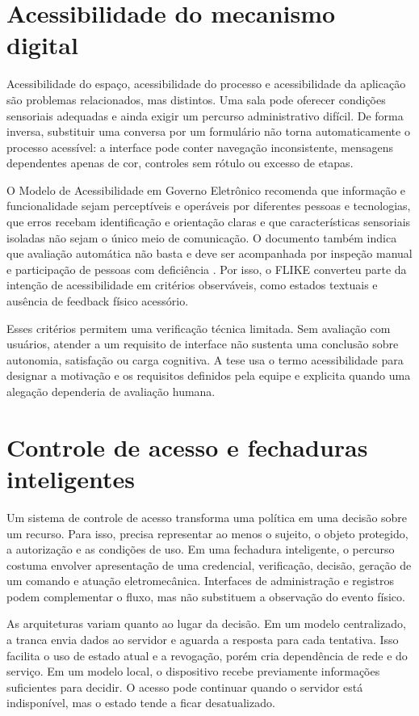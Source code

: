 \section{Acessibilidade do mecanismo digital}

Acessibilidade do espaço, acessibilidade do processo e acessibilidade da aplicação são problemas relacionados, mas distintos. Uma sala pode oferecer condições sensoriais adequadas e ainda exigir um percurso administrativo difícil. De forma inversa, substituir uma conversa por um formulário não torna automaticamente o processo acessível: a interface pode conter navegação inconsistente, mensagens dependentes apenas de cor, controles sem rótulo ou excesso de etapas.

O Modelo de Acessibilidade em Governo Eletrônico recomenda que informação e funcionalidade sejam perceptíveis e operáveis por diferentes pessoas e tecnologias, que erros recebam identificação e orientação claras e que características sensoriais isoladas não sejam o único meio de comunicação. O documento também indica que avaliação automática não basta e deve ser acompanhada por inspeção manual e participação de pessoas com deficiência \cite{brasil2014emag}. Por isso, o FLIKE converteu parte da intenção de acessibilidade em critérios observáveis, como estados textuais e ausência de feedback físico acessório.

Esses critérios permitem uma verificação técnica limitada. Sem avaliação com usuários, atender a um requisito de interface não sustenta uma conclusão sobre autonomia, satisfação ou carga cognitiva. A tese usa o termo acessibilidade para designar a motivação e os requisitos definidos pela equipe e explicita quando uma alegação dependeria de avaliação humana.

\section{Controle de acesso e fechaduras inteligentes}

Um sistema de controle de acesso transforma uma política em uma decisão sobre um recurso. Para isso, precisa representar ao menos o sujeito, o objeto protegido, a autorização e as condições de uso. Em uma fechadura inteligente, o percurso costuma envolver apresentação de uma credencial, verificação, decisão, geração de um comando e atuação eletromecânica. Interfaces de administração e registros podem complementar o fluxo, mas não substituem a observação do evento físico.

As arquiteturas variam quanto ao lugar da decisão. Em um modelo centralizado, a tranca envia dados ao servidor e aguarda a resposta para cada tentativa. Isso facilita o uso de estado atual e a revogação, porém cria dependência de rede e do serviço. Em um modelo local, o dispositivo recebe previamente informações suficientes para decidir. O acesso pode continuar quando o servidor está indisponível, mas o estado tende a ficar desatualizado.

